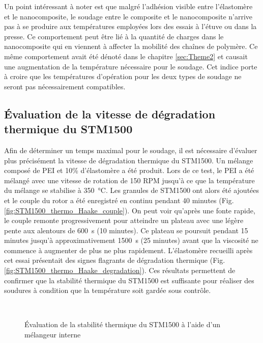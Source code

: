 \FloatBarrier

Un point intéressant à noter est que malgré l'adhésion visible entre l'élastomère et le nanocomposite, le soudage entre le composite et le nanocomposite n'arrive pas à se produire aux températures employées lors des essais à l'étuve ou dans la presse. 
Ce comportement peut être lié à la quantité de charges dans le nanocomposite qui en viennent à affecter la mobilité des chaînes de polymère. 
Ce même comportement avait été dénoté dans le chapitre \ref{sec:Theme2} et causait une augmentation de la température nécessaire pour le soudage. 
Cet indice porte à croire que les températures d'opération pour les deux types de soudage ne seront pas nécessairement compatibles. 
\clearpage

\subsection{Évaluation de la vitesse de dégradation thermique du STM1500}

Afin de déterminer un temps maximal pour le soudage, il est nécessaire d'évaluer plus précisément la vitesse de dégradation thermique du STM1500. 
Un mélange composé de PEI et 10\% d'élastomère a été produit. 
Lors de ce test, le PEI a été mélangé avec une vitesse de rotation de 150 RPM jusqu'à ce que la température du mélange se stabilise à \SI{350}{\celsius}. 
Les granules de STM1500 ont alors été ajoutées et le couple du rotor a été enregistré en continu pendant 40 minutes (Fig. \ref{fig:STM1500_thermo_Haake_couple}). 
On peut voir qu'après une fonte rapide, le couple remonte progressivement pour atteindre un plateau avec une légère pente aux alentours de \SI{600}{\second} (10 minutes). 
Ce plateau se poursuit pendant 15 minutes jusqu'à approximativement \SI{1500}{\second} (25 minutes) avant que la viscosité ne commence à augmenter de plus ne plus rapidement. 
L'élastomère recueilli après cet essai présentait des signes flagrants de dégradation thermique (Fig. \ref{fig:STM1500_thermo_Haake_degradation}). 
Ces résultats permettent de confirmer que la stabilité thermique du STM1500 est suffisante pour réaliser des soudures à condition que la température soit gardée sous contrôle. 

\begin{figure}[h]	
	\centering
	 \qquad
	 \\
	\caption{Évaluation de la stabilité thermique du STM1500 à l'aide d'un mélangeur interne}
	\label{fig:STM1500_thermo_Haake}
\end{figure}

